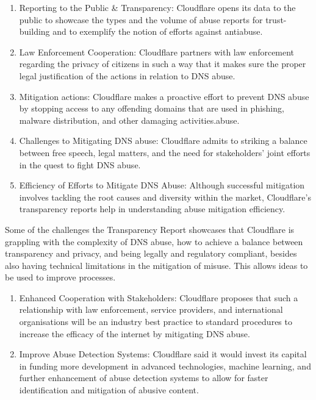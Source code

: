 \begin{enumerate}
\begin{enumerate}

\item Reporting to the Public \& Transparency: Cloudflare opens its data to the public to showcase the types and the volume of abuse reports for trust-building and to exemplify the notion of efforts against antiabuse.

\item Law Enforcement Cooperation: Cloudflare partners with law enforcement regarding the privacy of citizens in such a way that it makes sure the proper legal justification of the actions in relation to DNS abuse.


\item Mitigation actions: Cloudflare makes a proactive effort to prevent DNS abuse by stopping access to any offending domains that are used in phishing, malware distribution, and other damaging activities.abuse.

\item Challenges to Mitigating DNS abuse: Cloudflare admits to striking a balance between free speech, legal matters, and the need for stakeholders' joint efforts in the quest to fight DNS abuse.

\item Efficiency of Efforts to Mitigate DNS Abuse: Although successful mitigation involves tackling the root causes and diversity within the market, Cloudflare's transparency reports help in understanding abuse mitigation efficiency.

\end{enumerate}

Some of the challenges the Transparency Report showcases that Cloudflare is grappling with the complexity of DNS abuse, how to achieve a balance between transparency and privacy, and being legally and regulatory compliant, besides also having technical limitations in the mitigation of misuse. This allows ideas to be used to improve processes.

\begin{enumerate}
    \item Enhanced Cooperation with Stakeholders: Cloudflare proposes that such a relationship with law enforcement, service providers, and international organisations will be an industry best practice to standard procedures to increase the efficacy of the internet by mitigating DNS abuse.
    
    \item Improve Abuse Detection Systems: Cloudflare said it would invest its capital in funding more development in advanced technologies, machine learning, and further enhancement of abuse detection systems to allow for faster identification and mitigation of abusive content.
    

\end{enumerate}
\end{enumerate}
